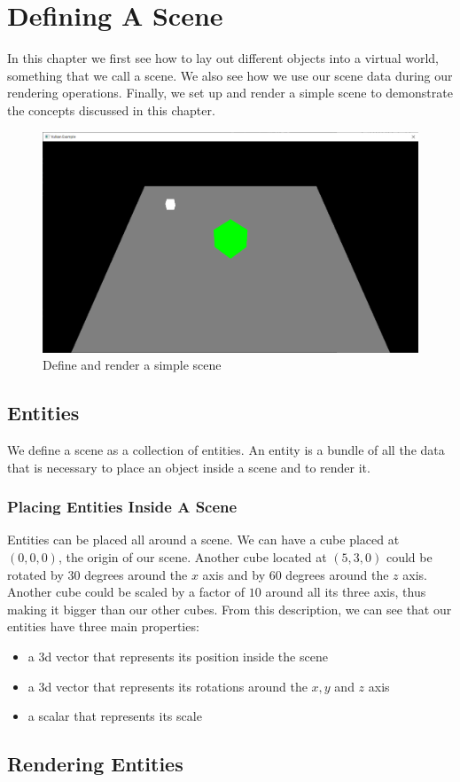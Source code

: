 \chapter{Defining A Scene}

In this chapter we first see how to lay out different objects into a
virtual world, something that we call a scene.
We also see how we use our scene data during our rendering operations.
Finally, we set up and render a simple scene to demonstrate the
concepts discussed in this chapter.

\begin{figure}[ht]
    \centering
    \includegraphics[scale=0.20]{images/ChScene/SimpleScene.png}
    \caption{Define and render a simple scene}
    \label{fig::SimpleScene}
\end{figure}

\section{Entities}

We define a scene as a collection of entities.
An entity is a bundle of all the data that is necessary to place
an object inside a scene and to render it.

\subsection{Placing Entities Inside A Scene}

Entities can be placed all around a scene.
We can have a cube placed at $(0, 0, 0)$, the origin of our scene.
Another cube located at $(5, 3, 0)$ could be rotated by $30$
degrees around the $x$ axis and by $60$ degrees around the $z$ axis.
Another cube could be scaled by a factor of $10$ around all its three axis,
thus making it bigger than our other cubes.
From this description, we can see that our entities have three main properties:
\begin{itemize}
    \item a 3d vector that represents its position inside the scene
    \item a 3d vector that represents its rotations around the $x, y$ and $z$ axis
    \item a scalar that represents its scale
\end{itemize}



\section{Rendering Entities}
